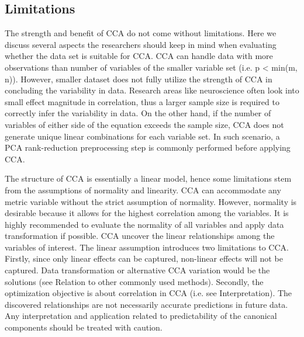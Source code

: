 
\subsection{Limitations}
\label{methods:limitations}
The strength and benefit of CCA do not come without limitations. Here we discuss several aspects the researchers should keep in mind when evaluating whether the data set is suitable for CCA. CCA can handle data with more observations than number of variables of the smaller variable set (i.e. p < min(m, n)). However, smaller dataset does not fully utilize the strength of CCA in concluding the variability in data. Research areas like neuroscience often look into small effect magnitude in correlation, thus a larger sample size is required to correctly infer the variability in data. On the other hand, if the number of variables of either side of the equation exceeds the sample size, CCA does not generate unique linear combinations for each variable set.  In such scenario, a PCA rank-reduction preprocessing step is commonly performed before applying CCA. 

The structure of CCA is essentially a linear model, hence some limitations stem from the assumptions of normality and linearity. CCA can accommodate any metric variable without the strict assumption of normality. However, normality is desirable because it allows for the highest correlation among the variables. It is highly recommended to evaluate the normality of all variables and apply data transformation if possible. CCA uncover the linear relationships among the variables of interest. The linear assumption introduces two limitations to CCA. Firstly, since only linear effects can be captured, non-linear effects will not be captured. Data transformation or alternative CCA variation would be the solutions (see Relation to other commonly used methods). Secondly, the optimization objective is about correlation in CCA (i.e. see Interpretation). The discovered relationships are not necessarily accurate predictions in future data. Any interpretation and application related to predictability of the canonical components should be treated with caution. 





